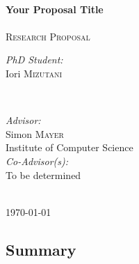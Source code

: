 \documentclass[a4paper,11pt]{article}
\begin{document}
\begin{titlepage}
\HRule \\[0.6cm]
{ \huge \bfseries Your Proposal Title}\\[0.4cm]
\HRule \\[0.4cm]

\textsc{\Large Research Proposal}


\vspace*{\fill}

\begin{minipage}{0.4\textwidth}
\begin{flushleft} \large
\emph{PhD Student:}\\
Iori \textsc{Mizutani} \\ 
\end{flushleft}
\end{minipage}
~
\begin{minipage}{0.5\textwidth}
\begin{flushright} \large
\emph{Advisor:} \\
Simon \textsc{Mayer} \\
Institute of Computer Science\\[0.5cm]
\emph{Co-Advisor(s):} \\
To be determined
\end{flushright}
\end{minipage}\\[2cm]


{\large \today}

\vfill %

\end{titlepage}

\subsection*{Summary}

\lipsum

\newpage









\end{document}
